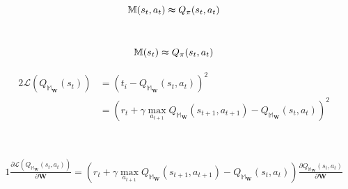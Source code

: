 \documentclass[xcolor={table}]{beamer}
\begin{document}
 \begin{frame} 
\begin{equation}
\mathbb{M}(s_{t}, a_t) \thickapprox Q_{\pi}(s_t, a_t)
\end{equation}

~\\

\begin{equation}
\mathbb{M}(s_{t}) \thickapprox Q_{\pi}(s_t, a_t)
\end{equation}
\end{frame} 



 \begin{frame} 
 \begin{scriptsize}
\begin{alignat}{2}
\mathcal{L}(Q_{\mathbb{M}_{\mathbf{W}}}(s_t)) & = \left(t_i - Q_{\mathbb{M}_{\mathbf{W}}}\left(s_{t}, a_t\right)\right)^2 \\
~ & = \left(r_t +\gamma\max_{a_{t+1}}Q_{\mathbb{M}_{\mathbf{W}}}\left(s_{t+1}, a_{t+1}\right) - Q_{\mathbb{M}_{\mathbf{W}}}\left(s_{t}, a_t\right)\right)^2
\label{eqn:dqn_loss}
\end{alignat}
\end{scriptsize}

~\\

\begin{scriptsize}
\begin{alignat}{1}
\frac{\partial\mathcal{L}(Q_{\mathbb{M}_{\mathbf{W}}}(s_t, a_{t})) }{\partial \mathbf{W}} = \left(r_t +\gamma\max_{a_{t+1}}Q_{\mathbb{M}_{\mathbf{W}}}\left(s_{t+1}, a_{t+1}\right) - Q_{\mathbb{M}_{\mathbf{W}}}\left(s_{t}, a_t\right)\right)
\frac{\partial Q_{\mathbb{M}_{\mathbf{W}}}(s_t, a_t)}{\partial \mathbf{W}}
\label{eqn:dqn_loss_gradient}
\end{alignat}
\end{scriptsize}
\end{frame} 
\end{document}
